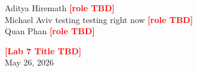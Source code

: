 \documentclass[11pt,letterpaper]{article}
\newcommand{\tbd}[1][TBD]{\textcolor{red}{\textbf{[#1]}}}
\begin{document}
\begin{flushright}
  \small Aditya Hiremath \tbd[role TBD]\\
  Michael Aviv testing testing right now \tbd[role TBD]\\
  Quan Phan \tbd[role TBD]
\end{flushright}
\vspace{-1.2em}

\begin{center}
  {\Large\bfseries \tbd[Lab 7 Title TBD]}\\[3pt]
  \small May 26, 2026
\end{center}
\vspace{0.5em}








\end{document}
